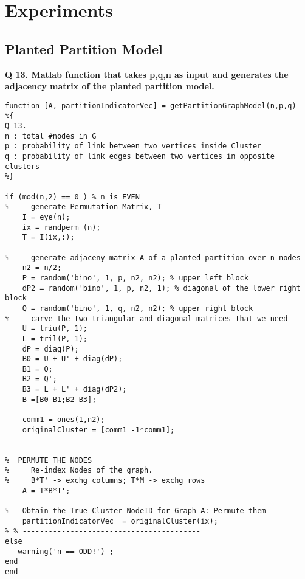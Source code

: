 \documentclass[9pt]{article}
\begin{document}
 


\section{Experiments}

\subsection{Planted Partition Model}

\textbf{Q 13. Matlab function that takes p,q,n as input and generates the adjacency matrix of the planted partition model. } 

\begin{lstlisting}
function [A, partitionIndicatorVec] = getPartitionGraphModel(n,p,q)
%{ 
Q 13.
n : total #nodes in G
p : probability of link between two vertices inside Cluster
q : probability of link edges between two vertices in opposite clusters
%}

if (mod(n,2) == 0 ) % n is EVEN
%     generate Permutation Matrix, T
    I = eye(n);
    ix = randperm (n);
    T = I(ix,:);

%     generate adjaceny matrix A of a planted partition over n nodes
    n2 = n/2;
    P = random('bino', 1, p, n2, n2); % upper left block
    dP2 = random('bino', 1, p, n2, 1); % diagonal of the lower right block
    Q = random('bino', 1, q, n2, n2); % upper right block
%     carve the two triangular and diagonal matrices that we need
    U = triu(P, 1);
    L = tril(P,-1);
    dP = diag(P);
    B0 = U + U' + diag(dP);
    B1 = Q;
    B2 = Q';
    B3 = L + L' + diag(dP2);
    B =[B0 B1;B2 B3];

    comm1 = ones(1,n2);
    originalCluster = [comm1 -1*comm1];
    

%  PERMUTE THE NODES
%     Re-index Nodes of the graph. 
%     B*T' -> exchg columns; T*M -> exchg rows
    A = T*B*T'; 

%   Obtain the True_Cluster_NodeID for Graph A: Permute them
    partitionIndicatorVec  = originalCluster(ix);
% % -----------------------------------------
else
   warning('n == ODD!') ;
end
end

\end{lstlisting}
\end{document}
